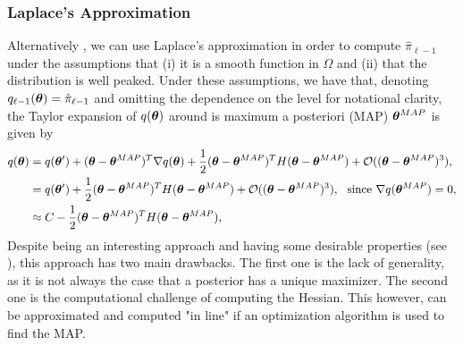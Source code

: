 \subsubsection{Laplace's Approximation}
Alternatively , we can use Laplace's approximation in order to compute $\hat{\pi}_{\ell-1}$ under the assumptions that (i) it is a smooth function in $\Omega$ and (ii) that the distribution is well peaked. Under these assumptions, we have that, denoting $q_{\ell-1}(\bm{\theta})=\hat{\pi}_{\ell-1}$ and  omitting the dependence on the level for notational clarity, the Taylor expansion of $q(\bm{\theta})$ around is maximum a posteriori (MAP) $\bm{\theta}^{MAP}$ is given by 
\begin{align}
q(\bm{\theta})&=q(\bm{\theta}')+(\bm{\theta}-\bm{\theta}^{MAP})^T\nabla q(\bm{\theta})+\frac{1}{2}(\bm{\theta}-\bm{\theta}^{MAP})^TH(\bm{\theta}-\bm{\theta}^{MAP}) + \mathcal{O}((\bm{\theta}-\bm{\theta}^{MAP})^3) \nonumber,\\
&=q(\bm{\theta}')+\frac{1}{2}(\bm{\theta}-\bm{\theta}^{MAP})^TH(\bm{\theta}-\bm{\theta}^{MAP}) + \mathcal{O}((\bm{\theta}-\bm{\theta}^{MAP})^3), \ \ \text {since $\nabla q(\bm{\theta}^{MAP})=0$}\nonumber,\\
&\approx C-\frac{1}{2}(\bm{\theta}-\bm{\theta}^{MAP})^TH(\bm{\theta}-\bm{\theta}^{MAP}),
\end{align}
Despite being an interesting approach and having some desirable properties (see \cite{schillings2018}), this approach has two main drawbacks. The first one is the lack of generality, as it is not always the case that a posterior has a unique maximizer. The second one is the computational challenge of computing the Hessian. This however, can be approximated and computed "in line" if an optimization algorithm is used to find the MAP. 
